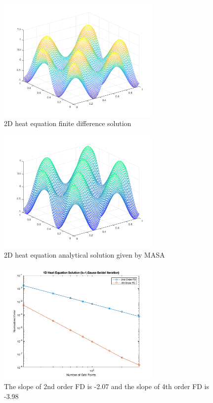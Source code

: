 \documentclass{article}
\begin{document}
\begin{figure}[h!]
  \includegraphics[width=8cm]{figure_5}
  \caption{2D heat equation finite difference solution}
\end{figure}

\begin{figure}[h!]
  \includegraphics[width=8cm]{figure_6}
  \caption{2D heat equation analytical solution given by MASA}
\end{figure}

\begin{figure}[h!]
  \includegraphics[width=8cm]{figure_7}
  \caption{The slope of 2nd order FD is -2.07 and the slope of 4th order FD is -3.98}
\end{figure}
\end{document}
